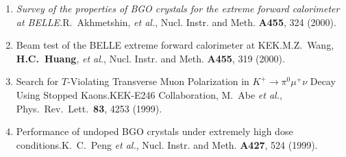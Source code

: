 \documentclass[10pt,a4paper]{article}
\def\pub#1#2#3{{\it #1.}\newline #2, #3.}
\def\mypub#1#2#3{{#1.}\newline #2, #3.}
\def\mybpub#1#2#3{{\boldmath \bf #1.}\newline #2, #3.}
\def\cited#1{Cited $\ge$ #1}
\def\NIM{Nucl. Instr. and Meth. }
\def\NIMA#1{Nucl. Instr. and Meth. \textbf{A#1}}
\def\etal{{\it et al.}}
\def\impf#1#2{\def\tempa{}\def\tempb{#2}\ifx\tempa\tempb%
IF: #1%
\else
IF: #1, #2\%%
\fi
}
\def\iprl{\impf{6.944}{}}
\begin{document}
\begin{enumerate}


\item 
\pub{Survey of the properties of BGO crystals for the extreme
forward  calorimeter at BELLE}
{R.~Akhmetshin, \etal}
{\NIM {\bf A455}, 324 (2000)}






\item 
\mypub{Beam test of the BELLE extreme forward calorimeter at KEK}
{M.Z.~Wang, {\bf H.C.~Huang}, \etal}
{\NIM {\bf A455}, 319 (2000)}

\item 
\mypub
{Search for $T$-Violating Transverse Muon Polarization in $K^+ \to
\pi^0 \mu^+ \nu$ Decay Using Stopped Kaons}
{KEK-E246 Collaboration, M.~Abe \etal}
{Phys.\ Rev.\ Lett.\  {\bf 83}, 4253 (1999)}

\item 
\mypub{Performance of undoped BGO crystals under extremely high
dose conditions} 
{K.~C.~Peng {\it et al.}}
{\NIM {\bf A427}, 524 (1999)}


\end{enumerate}
\end{document}
